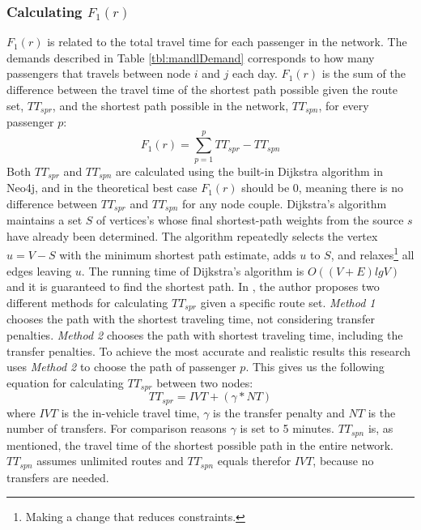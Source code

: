 \subsubsection*{Calculating $F_{1}(r)$}
\label{sec:f1}
$F_{1}(r)$ is related to the total travel time for each passenger in the network. The demands described in Table \vref{tbl:mandlDemand} corresponds to how many passengers that travels between node $i$ and $j$ each day. $F_{1}(r)$ is the sum of the difference between the travel time of the shortest path possible given the route set, $TT_{spr}$, and the shortest path possible in the network, $TT_{spn}$, for every passenger $p$:
\newline
$$F_{1}(r) = \sum\limits^{p}_{p=1}TT_{spr}-TT_{spn}$$
\newline
Both $TT_{spr}$ and $TT_{spn}$ are calculated using the built-in Dijkstra algorithm in Neo4j, and in the theoretical best case $F_{1}(r)$ should be 0, meaning there is no difference between $TT_{spr}$ and $TT_{spn}$ for any node couple. Dijkstra's algorithm \citet[p.658-662]{cormen09} maintains a set $S$ of vertices's whose final shortest-path weights from the source $s$ have already been determined. The algorithm repeatedly selects the vertex $u = V - S$ with the minimum shortest path estimate, adds $u$ to $S$, and relaxes\footnote{Making a change that reduces constraints.} all edges leaving $u$. The running time of Dijkstra's algorithm is $O((V + E)lg V)$ and it is guaranteed to find the shortest path\citep[p.~661]{cormen09}. In \citet{mandl79}, the author proposes two different methods for calculating $TT_{spr}$ given a specific route set. \textit{Method 1} chooses the path with the shortest traveling time, not considering transfer penalties. \textit{Method 2} chooses the path with shortest traveling time, including the transfer penalties. To achieve the most accurate and realistic results this research uses \textit{Method 2} to choose the path of passenger $p$. This gives us the following equation for calculating $TT_{spr}$ between two nodes: 
\newline
$$TT_{spr} = IVT + (\gamma*NT)$$
\newline
where $IVT$ is the in-vehicle travel time, $\gamma$ is the transfer penalty and $NT$ is the number of transfers. For comparison reasons $\gamma$ is set to 5 minutes. $TT_{spn}$ is, as mentioned, the travel time of the shortest possible path in the entire network. $TT_{spn}$ assumes unlimited routes and $TT_{spn}$ equals therefor $IVT$, because no transfers are needed.  


